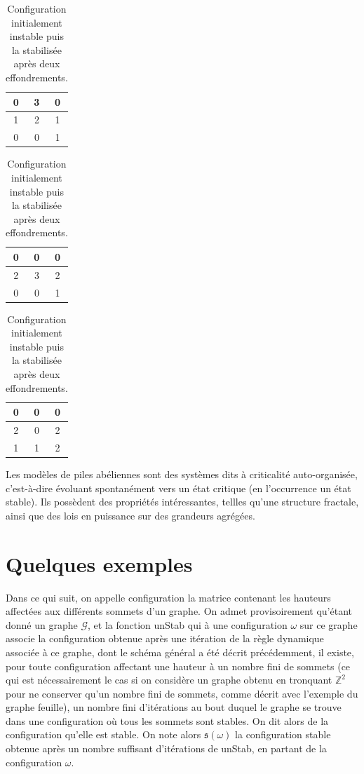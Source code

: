 \documentclass{article}
\begin{document}
    
\begin{table}[htb]
    \hfill
    \begin{tabular}{c|c|c}
        0 & 3 & 0\tabularnewline
        \hline
        1 & 2 & 1\tabularnewline
        \hline
        0 & 0 & 1
    \end{tabular}
    \hfill
    \begin{tabular}{c|c|c}
        0 & 0 & 0\tabularnewline
        \hline
        2 & 3 & 2\tabularnewline
        \hline
        0 & 0 & 1
    \end{tabular}
    \hfill
    \begin{tabular}{c|c|c}
        0 & 0 & 0\tabularnewline
        \hline
        2 & 0 & 2\tabularnewline
        \hline
        1 & 1 & 2
    \end{tabular}
    \hfill\null
    \caption{Configuration initialement instable puis la stabilisée après deux effondrements.}
    \label{uca}
\end{table}

Les modèles de piles abéliennes sont des systèmes dits à criticalité auto-organisée, c'est-à-dire évoluant  spontanément vers un état critique (en l'occurrence un état stable). Ils possèdent des propriétés intéressantes, tellles qu'une structure fractale, ainsi que des lois en puissance sur des grandeurs agrégées.

\section{Quelques exemples}
Dans ce qui suit, on appelle configuration la matrice contenant les hauteurs affectées aux différents sommets d'un graphe.
On admet provisoirement qu'étant donné un graphe $\mathcal{G}$, et la fonction unStab qui à une configuration $\omega$ sur ce graphe associe la configuration obtenue après une itération de la règle dynamique associée à ce graphe, dont le schéma général a été décrit précédemment, il existe, pour toute configuration affectant une hauteur à un nombre fini de sommets (ce qui est nécessairement le cas si on considère un graphe obtenu en tronquant $\mathbb{Z}^2$ pour ne conserver qu'un nombre fini de sommets, comme décrit avec l'exemple du graphe feuille), un nombre fini d'itérations au bout duquel le graphe se trouve dans une configuration où tous les sommets sont stables. On dit alors de la configuration qu'elle est stable. On note alors $\mathfrak{s}(\omega)$ la configuration stable obtenue après un nombre suffisant d'itérations de unStab, en partant de la configuration $\omega$. 
\end{document}
